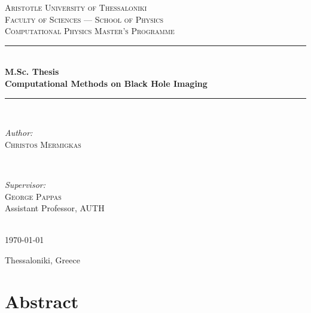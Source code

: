 \documentclass[11pt]{book}
\begin{document}
\begin{titlepage}
  \newcommand{\HRule}{\rule{\linewidth}{0.5mm}}
  \center
  \textsc{\LARGE Aristotle University of Thessaloniki}\\[1.5cm]
  \textsc{\large Faculty of Sciences --- School of Physics}\\[0.3cm]
  \textsc{\normalsize Computational Physics Master's Programme}\\[0.5cm]
  
  \HRule \\[0.4cm]
  { \huge \bfseries M.Sc. Thesis}\\[0.3cm]
  { \LARGE \bfseries Computational Methods on Black Hole Imaging }\\[0.2cm]
  \HRule \\[1.5cm]
  
  \begin{minipage}{0.45\textwidth}
    \begin{flushleft} \large
      \emph{Author:}\\
      \textsc{Christos Mermigkas}
    \end{flushleft}
  \end{minipage}
  ~
  \begin{minipage}{0.45\textwidth}
    \begin{flushright} \large
      \emph{Supervisor:} \\
      \textsc{George Pappas} \\
      \vspace{0.1cm}
      \small Assistant Professor, AUTH
    \end{flushright}
  \end{minipage}\\[2.5cm]
  
  {\large \today}\\[2cm]
  
  \vfill
  \begin{center}
    Thessaloniki, Greece
  \end{center}
\end{titlepage}

\section*{Abstract}
\end{document}
